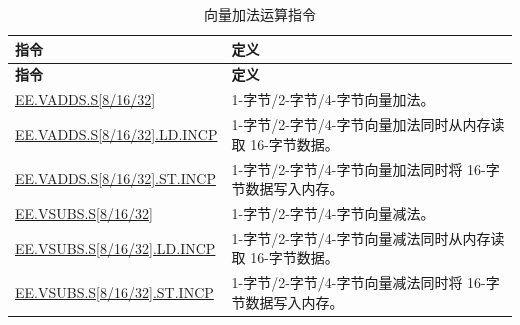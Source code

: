 \begin{longtable}[c]{|l|m{10cm}|}
    \caption{向量加法运算指令}
    \label{tab:pie-vadd-instructions}\\
    \hline
    \rowcolor{lightgray}
    \textbf{指令} & \textbf{定义} \\\hline
    \endfirsthead
    \rowcolor{lightgray}
    \textbf{指令} & \textbf{定义} \\\hline
    \endhead
    \endfoot
    
    \hyperref[instruction:EEVADDSS8]{EE.VADDS.S[8/16/32]} & 1-字节/2-字节/4-字节向量加法。
    \\\hline
    \hyperref[instruction:EEVADDSS8LDINCP]{EE.VADDS.S[8/16/32].LD.INCP} & 1-字节/2-字节/4-字节向量加法同时从内存读取 16-字节数据。
    \\\hline
    \hyperref[instruction:EEVADDSS8STINCP]{EE.VADDS.S[8/16/32].ST.INCP} & 1-字节/2-字节/4-字节向量加法同时将 16-字节数据写入内存。
    \\\hline
    \hyperref[instruction:EEVSUBSS8]{EE.VSUBS.S[8/16/32]} & 1-字节/2-字节/4-字节向量减法。
    \\\hline
    \hyperref[instruction:EEVSUBSS8LDINCP]{EE.VSUBS.S[8/16/32].LD.INCP} & 1-字节/2-字节/4-字节向量减法同时从内存读取 16-字节数据。
    \\\hline
    \hyperref[instruction:EEVSUBSS8STINCP]{EE.VSUBS.S[8/16/32].ST.INCP} & 1-字节/2-字节/4-字节向量减法同时将 16-字节数据写入内存。
    \\\hline
\end{longtable}